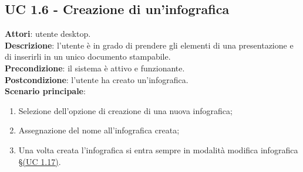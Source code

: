 \subsection{UC 1.6 - Creazione di un'infografica}{
	\label{uc1.6}
	\textbf{Attori}: utente desktop. \\
	\textbf{Descrizione}: l'utente è in grado di prendere gli elementi di una presentazione e di inserirli in un unico documento stampabile. \\
	\textbf{Precondizione}: il sistema è attivo e funzionante.	\\
	\textbf{Postcondizione}: l'utente ha creato un'infografica.	\\
	\textbf{Scenario principale}:
	\begin{enumerate}
		\item Selezione dell'opzione di creazione di una nuova infografica;
		\item Assegnazione del nome all'infografica creata;
		\item Una volta creata l'infografica si entra sempre in modalità modifica infografica \S\hyperref[uc1.17]{(UC 1.17)}.
	\end{enumerate}
	}
